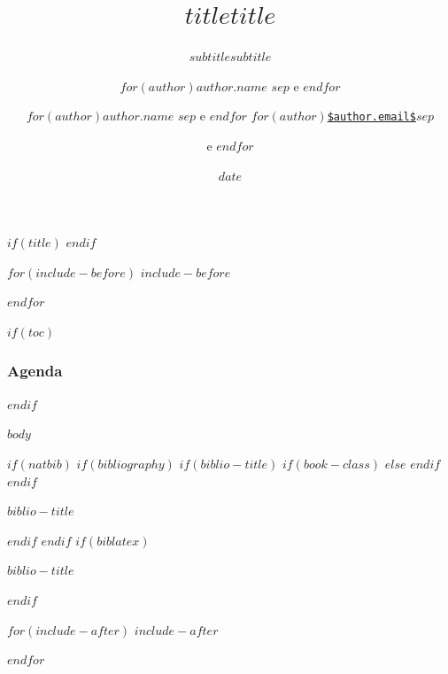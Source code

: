 \documentclass[$if(fontsize)$$fontsize$,$endif$$if(lang)$$babel-lang$,$endif$$if(handout)$handout,$endif$$if(beamer)$ignorenonframetext,$endif$$for(classoption)$$classoption$$sep$,$endfor$]{$documentclass$}
\title[$idsubjectcourseinstitution$ -- v.$version$]{\texttt{$title$}}
\subtitle{\emph{$subtitle$}}
\author[
$for(author)$\tiny $author.citation$$sep$ e $endfor$
] %
{
$for(author)$\small \textbf{$author.name$}\footnotesize\inst{$author.id$}\vspace{0.05in} $sep$ e $endfor$
\vspace{-0.5cm}
}
\institute[]{
\normalsize
$for(author)$
\inst{$author.id$}%
\footnotesize\emph{$author.affiliation$ \\ $author.department$ \\ $author.citystatecountry$} \newline \url{$author.email$}\vspace*{0.05in} $sep$ \and
\vspace{-0.3cm}
$endfor$
$if(coursename)$
\\ \textbf{$coursename$} \newline \texttt{$subjectname$}
$endif$
}
\date[$date$]{}
\date[\today]{}
\title[$idsubjectcourseinstitution$ - $classnumber$ - v.$version$] %
{\LARGE $title$}
\subtitle{\Large $subtitle$}
\author[
$for(author)$\tiny $author.citation$$sep$ e $endfor$
] %
{
$for(author)$\normalsize {$author.name$}\footnotesize\inst{$author.id$}\vspace{0.05in} $sep$ e $endfor$
\vspace{-0.2cm}
\newline
$for(author)$\normalsize\href{mailto:$author.email$}{\nolinkurl{$author.email$}}$sep$ \and e $endfor$
}
\institute[UTFPR]{
\normalsize
$for(author)$
\inst{$author.id$}%
\footnotesize{\vspace{-0.15cm}$author.affiliation$ \\ \vspace{-0.15cm} $author.department$ \\ \vspace{-0.15cm} $author.citystatecountry$} $sep$ \and
\vspace{-0.3cm}
$endfor$
\and
$if(coursename)$
\textbf{$coursename$}
\vspace{-0.1cm}
\\ $subjectname$
\vspace{0.5cm}
$endif$
}
\date[$date$]{$date$}
\date[\today]{}
\newif\ifbibliography
\begin{document}
$if(title)$
\frame{\vspace{1.0cm} \titlepage}
$endif$



$for(include-before)$
$include-before$

$endfor$

$if(toc)$
\begin{frame}
\frametitle{Agenda}
\tableofcontents[hideallsubsections]
\end{frame}
$endif$

$body$

$if(natbib)$
$if(bibliography)$
$if(biblio-title)$
$if(book-class)$
\renewcommand\bibname{$biblio-title$}
$else$
\renewcommand\refname{$biblio-title$}
$endif$
$endif$
\begin{frame}{$biblio-title$}
\bibliographytrue

\end{frame}

$endif$
$endif$
$if(biblatex)$
\begin{frame}{$biblio-title$}
\bibliographytrue
\printbibliography[heading=none]
\end{frame}

$endif$

$for(include-after)$
$include-after$

$endfor$
\end{document}
